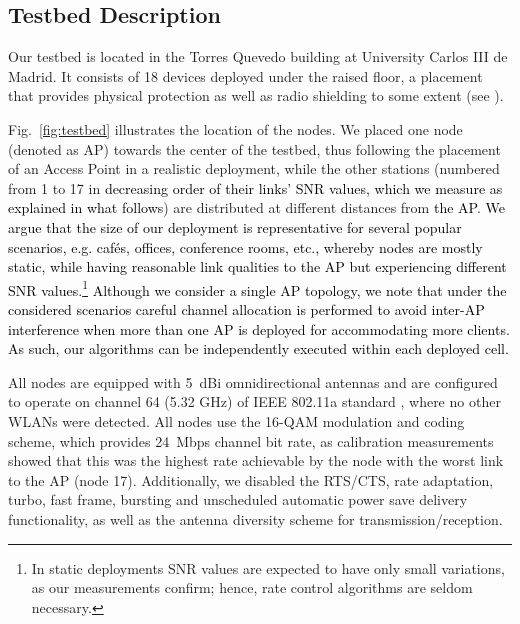 \documentclass[a4paper,10pt]{article}
\newcommand{\revs}[1]{\textcolor{black}{#1}}
\begin{document}
\subsection{Testbed Description}

Our testbed is located in the Torres Quevedo building at University Carlos III de Madrid. It consists of 18 devices deployed under the raised floor, a placement that provides physical protection as well as radio shielding to some extent (see \cite{serrano10eurasip}). 

Fig.~\ref{fig:testbed} illustrates the location of the nodes. We placed one node (denoted as AP) towards the center of the testbed, thus following the placement of an Access Point in a realistic deployment, while the other stations (numbered from 1 to 17 in \revs{decreasing order of their links' SNR values, which we measure as explained in what follows}) are distributed at different distances from \revs{the AP}. \revs{We argue that the size of our deployment is representative for several popular scenarios, e.g. caf\'es, offices, conference rooms, etc., whereby nodes are mostly static, while having reasonable link qualities to the AP but experiencing different SNR values.\footnote{In static deployments SNR values are expected to have only small variations, as our measurements confirm; hence, rate control algorithms are seldom necessary.} Although we consider a single AP topology, we note that under the considered scenarios careful channel allocation is performed to avoid inter-AP interference when more than one AP is deployed for accommodating more clients. As such, our algorithms can be independently executed within each deployed cell.}

All nodes are equipped with 5~dBi omnidirectional antennas and are configured to operate on channel 64 (5.32 GHz) of IEEE 802.11a standard \cite{80211A}, where no other WLANs were detected. All nodes use the 16-QAM modulation and coding scheme, which provides 24~Mbps channel bit rate, as calibration measurements showed that this was the highest rate achievable by the node with the worst link to the AP (node 17). Additionally, we disabled the RTS/CTS, rate adaptation, turbo, fast frame, bursting and unscheduled automatic power save delivery functionality, as well as the antenna diversity scheme for transmission/reception. 
\end{document}
